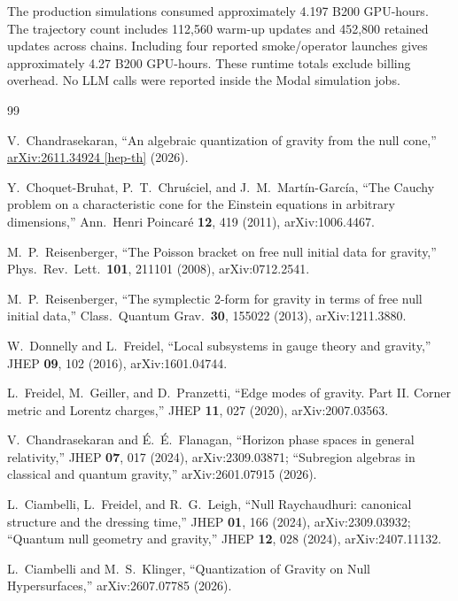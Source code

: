 \documentclass[onecolumn,11pt,aps,prd,amsmath,amssymb,nofootinbib,floatfix]{revtex4-2}
\begin{document}
The production simulations consumed approximately 4.197 B200 GPU-hours. The trajectory count includes 112{,}560 warm-up updates and 452{,}800 retained updates across chains. Including four reported smoke/operator launches gives approximately 4.27 B200 GPU-hours. These runtime totals exclude billing overhead. No LLM calls were reported inside the Modal simulation jobs.

\begin{thebibliography}{99}

V.~Chandrasekaran, ``An algebraic quantization of gravity from the null cone,'' \href{https://arxiv.org/abs/2611.34924}{arXiv:2611.34924 [hep-th]} (2026).

Y.~Choquet-Bruhat, P.~T.~Chru\'sciel, and J.~M.~Mart\'in-Garc\'ia, ``The Cauchy problem on a characteristic cone for the Einstein equations in arbitrary dimensions,'' Ann.\ Henri Poincar\'e \textbf{12}, 419 (2011), arXiv:1006.4467.

M.~P.~Reisenberger, ``The Poisson bracket on free null initial data for gravity,'' Phys.\ Rev.\ Lett.\ \textbf{101}, 211101 (2008), arXiv:0712.2541.

M.~P.~Reisenberger, ``The symplectic 2-form for gravity in terms of free null initial data,'' Class.\ Quantum Grav.\ \textbf{30}, 155022 (2013), arXiv:1211.3880.

W.~Donnelly and L.~Freidel, ``Local subsystems in gauge theory and gravity,'' JHEP \textbf{09}, 102 (2016), arXiv:1601.04744.

L.~Freidel, M.~Geiller, and D.~Pranzetti, ``Edge modes of gravity. Part II. Corner metric and Lorentz charges,'' JHEP \textbf{11}, 027 (2020), arXiv:2007.03563.

V.~Chandrasekaran and \'E.~\'E.~Flanagan, ``Horizon phase spaces in general relativity,'' JHEP \textbf{07}, 017 (2024), arXiv:2309.03871; ``Subregion algebras in classical and quantum gravity,'' arXiv:2601.07915 (2026).

L.~Ciambelli, L.~Freidel, and R.~G.~Leigh, ``Null Raychaudhuri: canonical structure and the dressing time,'' JHEP \textbf{01}, 166 (2024), arXiv:2309.03932; ``Quantum null geometry and gravity,'' JHEP \textbf{12}, 028 (2024), arXiv:2407.11132.

L.~Ciambelli and M.~S.~Klinger, ``Quantization of Gravity on Null Hypersurfaces,'' arXiv:2607.07785 (2026).


\end{thebibliography}
\end{document}
